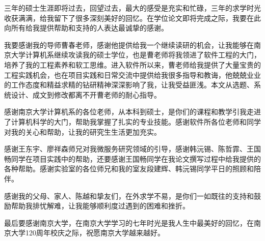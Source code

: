 \documentclass[winfonts,master,twoside]{njuthesis}
\begin{document}
\begin{acknowledgement}
三年的硕士生涯即将过去，回望过去，最大的感受是充实和忙碌，三年的求学时光收获满满，给我留下了很多深刻美好的回忆。在学位论文即将完成之际，我要在此向所有给我提供帮助和支持的人表达最诚挚的感谢。

我要感谢我的导师曹春老师，感谢他提供给我一个继续读研的机会，让我能够在南京大学计算机系继续攻读我的硕士学位，也是曹老师将我领进了软件工程的大门，培养了我的工程素养和软工思维。进入软件所以来，曹老师给我提供了大量宝贵的工程实践机会，也在项目实践和日常交流中提供给我很多指导和教诲，他兢兢业业的工作态度和精益求精的钻研精神深深影响了我，让我受益匪浅。本文从选题、系统设计、成文到修改都离不开曹老师的耐心指导。

感谢南京大学计算机系的各位老师，从本科到硕士，是你们的课程和教学引我走进了计算机科学的大门，帮助我掌握了扎实的专业技能。感谢软件所各位老师和同学对我的关心和帮助，让我的研究生生活更加充实。

感谢王东宇、廖祥森师兄对我微服务研究领域的引导，感谢韩沅锡、陈哲霏、王国畅同学在项目实践中的帮助，还要感谢王国畅同学在我论文撰写过程中给我提供的各种帮助。感谢实验室的各位师兄和我的室友段建辉、韩沅锡同学平日的照顾和陪伴。

感谢我的父母、家人、陈越和挚友们，在外求学不易，是你们一如既往的支持和鼓励帮助我排忧解难，让我能够顺利度过遇到的困难和挫折。

最后要感谢南京大学，在南京大学学习的七年时光是我人生中最美好的回忆，在南京大学120周年校庆之际，祝愿南京大学越来越好。
\end{acknowledgement}










\backmatter
\end{document}
